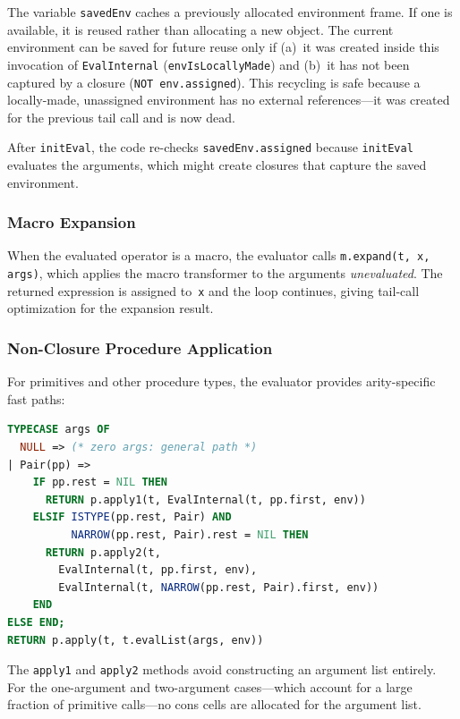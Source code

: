 \documentclass[12pt]{report}
\begin{document}
The variable \texttt{savedEnv} caches a previously allocated environment
frame.  If one is available, it is reused rather than allocating a new
object.  The current environment can be saved for future reuse only if
(a)~it was created inside this invocation of \texttt{EvalInternal}
(\texttt{envIsLocallyMade}) and (b)~it has not been captured by a closure
(\texttt{NOT env.assigned}).  This recycling is safe because a locally-made,
unassigned environment has no external references---it was created for
the previous tail call and is now dead.

After \texttt{initEval}, the code re-checks \texttt{savedEnv.assigned}
because \texttt{initEval} evaluates the arguments, which might create
closures that capture the saved environment.

\subsubsection{Macro Expansion}

When the evaluated operator is a macro, the evaluator calls
\texttt{m.expand(t, x, args)}, which applies the macro transformer
to the arguments \emph{unevaluated}.  The returned expression is
assigned to~\texttt{x} and the loop continues, giving tail-call
optimization for the expansion result.

\subsubsection{Non-Closure Procedure Application}

For primitives and other procedure types, the evaluator provides
arity-specific fast paths:

\begin{lstlisting}[language=Modula3]
TYPECASE args OF
  NULL => (* zero args: general path *)
| Pair(pp) =>
    IF pp.rest = NIL THEN
      RETURN p.apply1(t, EvalInternal(t, pp.first, env))
    ELSIF ISTYPE(pp.rest, Pair) AND
          NARROW(pp.rest, Pair).rest = NIL THEN
      RETURN p.apply2(t,
        EvalInternal(t, pp.first, env),
        EvalInternal(t, NARROW(pp.rest, Pair).first, env))
    END
ELSE END;
RETURN p.apply(t, t.evalList(args, env))
\end{lstlisting}

The \texttt{apply1} and \texttt{apply2} methods avoid constructing
an argument list entirely.  For the one-argument and two-argument
cases---which account for a large fraction of primitive
calls---no cons cells are allocated for the argument list.
\end{document}
